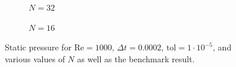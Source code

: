\begin{figure}[p]
    \vspace{0.5cm}
    
    \begin{subfigure}[b]{0.49\textwidth}
	    \caption{$N = 32$}
    	\label{fig:pressuree}
    \end{subfigure}
    \begin{subfigure}[b]{0.49\textwidth}
	    \caption{$N = 16$}
	    \label{fig:pressuref}
    \end{subfigure}
    \caption{Static pressure for $\text{Re} = 1000$, $\Delta t = 0.0002$, $\text{tol} = 1 \cdot 10^{-5}$, and various values of $N$ as well as the benchmark result.}
    \label{fig:allpressure}
\end{figure}

